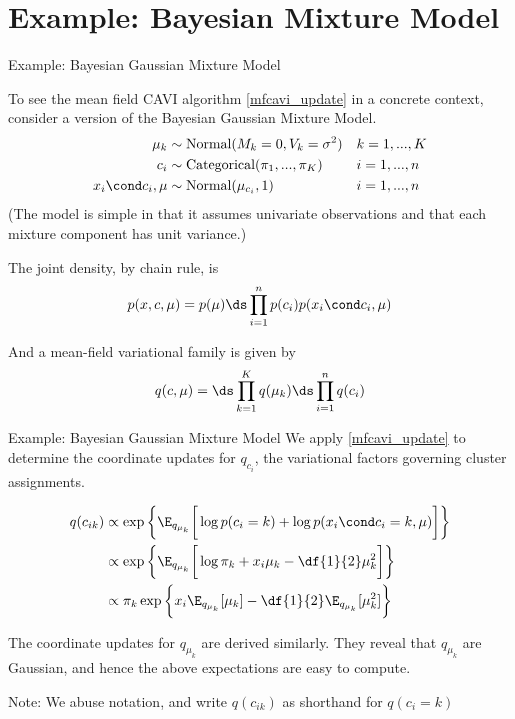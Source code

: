 \documentclass[10pt]{beamer}
\begin{document}
\section{Example: Bayesian Mixture Model}
\begin{frame}{Example: Bayesian Gaussian Mixture Model}

To see the mean field CAVI algorithm \eqref{mfcavi_update} in a concrete context, consider a version of the Bayesian Gaussian Mixture Model.  
\begin{align*}
\mu_k & \sim \text{Normal}(M_k = 0, V_k = \sigma^2) && k = 1,..., K\\
c_i & \sim \text{Categorical}(\pi_1, ..., \pi_K) && i=1, ... ,n \\
x_i \cond c_i, \mu & \sim \text{Normal}(\mu_{c_i}, 1) && i = 1,..., n
\end{align*}
\tiny (The model is simple in that it assumes univariate observations and that each mixture component has unit variance.) \normalsize 

The joint density, by chain rule, is
\[ p(x,c,\mu) = p(\mu) \ds\prod_{i=1}^n p(c_i) p(x_i \cond c_i, \mu) \]

And a mean-field variational family is given by 
\[  q(c, \mu) = \ds\prod_{k=1}^K q(\mu_k) \ds\prod_{i=1}^n q(c_i) \]

\end{frame}

\begin{frame}{Example: Bayesian Gaussian Mixture Model}
We apply \eqref{mfcavi_update} to determine the coordinate updates for $q_{c_i}$, the variational factors governing cluster assignments.   %

\begin{align*}
q(c_{ik}) & \propto \exp \bigg\{ \E_{q_{\mu_k}} \bigg[  \log p(c_i =k) + \log p(x_i \cond c_i=k, \mu) \bigg] \bigg\} \\
& \propto \exp \bigg\{ \E_{q_{\mu_k}} \bigg[ \log \pi_k + x_i \mu_k - \df{1}{2} \mu_k^2 \bigg] \bigg\} \\
& \propto \pi_k \exp \bigg\{ x_i \E_{q_{\mu_k}} [\mu_k] - \df{1}{2}  \E_{q_{\mu_k}} [ \mu_k^2] \bigg\} \\
\end{align*}

The coordinate updates for $q_{\mu_k}$ are derived similarly.  They reveal that $q_{\mu_k}$ are Gaussian, and hence the above expectations are easy to compute. 

\vfill
\tiny
\alert{Note:} We abuse notation, and write $q(c_{ik})$ as shorthand for $q(c_i =k)$
\end{frame}
\end{document}
